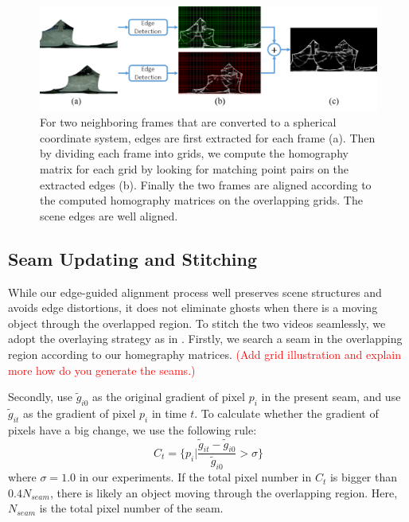 \documentclass[conference]{IEEEtran}
\begin{document}
\begin{figure}[!htpb]
\centering
\includegraphics[scale=0.22]{picture41.png}
\caption{For two neighboring frames that are converted to a spherical coordinate system, edges are first extracted for each frame (a). Then by dividing each frame into grids,  we compute the homography matrix for each grid by looking for matching point pairs on the extracted edges (b).
Finally the two frames are aligned according to the computed homography matrices on the overlapping grids. The scene edges are well aligned.}
\label{fig:p8}
\end{figure}

\subsection{Seam Updating and Stitching}
\label{ssec:stitching}


While our edge-guided alignment process well preserves scene structures and avoids edge distortions, it does not eliminate ghosts when there is a moving object through the overlapped region.
To stitch the two videos seamlessly, we adopt the overlaying strategy as in \cite{he2016parallax}. 
Firstly, we search a seam in the overlapping region according to our homegraphy matrices.
\textcolor{red}{(Add grid illustration and explain more how do you generate the seams.)} 
%


Secondly, use $\widetilde{g}_{i0}$ as the original gradient of pixel $p_i$ in the present seam, and use $\widetilde{g}_{it}$ as the gradient of pixel $p_i$ in time $t$. To calculate whether the gradient
of pixels have a big change, we use the following rule:
\begin{equation}
\textit{C}_{t}=\{p_{i}|\frac{\widetilde{g}_{it}-\widetilde{g}_{i0}}{\widetilde{g}_{i0}}>\sigma\}
\end{equation}
where $\sigma=1.0$ in our experiments.
If the total pixel number in $\textit{C}_t$ is bigger than $0.4N_{seam}$, there is likely an object moving through the overlapping region. Here, $N_{seam}$ is the total pixel number of the seam. 
\end{document}
